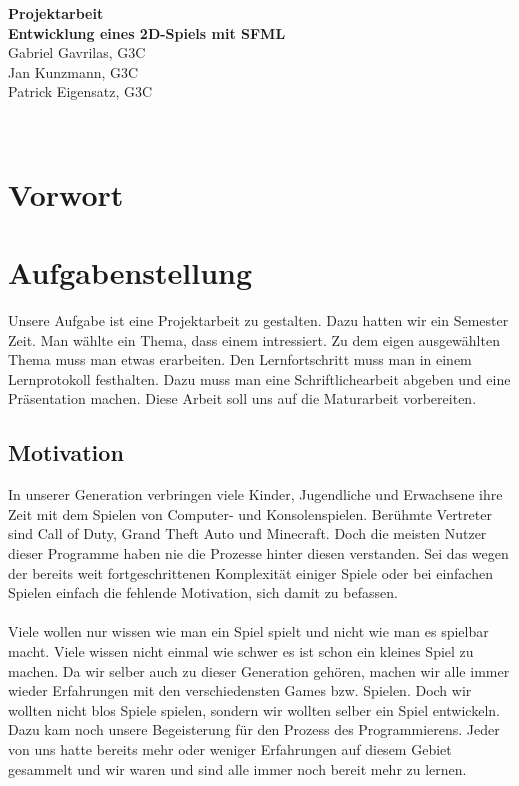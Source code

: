 \documentclass[12pt,a4paper]{scrartcl}
\begin{document}
\begin{titlepage}
\begin{center}

\vspace*{3cm}
\textbf{\huge{Projektarbeit}}\\
\vspace*{2cm}
\textbf{\large{Entwicklung eines 2D-Spiels mit SFML}}\\
\vspace*{5cm}
Gabriel Gavrilas, G3C\\
Jan Kunzmann, G3C\\
Patrick Eigensatz, G3C
\end{center}
\end{titlepage}


\clearpage
\newpage
\mbox{ }
\clearpage

\setcounter{page}{1}
\section*{Vorwort}


\newpage

\tableofcontents

\newpage

\section{Aufgabenstellung} 
Unsere Aufgabe ist eine Projektarbeit zu gestalten. Dazu hatten wir ein Semester Zeit. Man wählte ein Thema, dass einem intressiert. 
Zu dem eigen ausgewählten Thema muss man etwas erarbeiten. Den Lernfortschritt muss man in einem Lernprotokoll festhalten.
Dazu muss man eine Schriftlichearbeit abgeben und eine Präsentation machen. Diese Arbeit soll uns auf die Maturarbeit
vorbereiten.


\subsection{Motivation}
In unserer Generation verbringen viele Kinder, Jugendliche und Erwachsene
ihre Zeit mit dem Spielen von Computer- und Konsolenspielen.
Berühmte Vertreter sind Call of Duty, Grand Theft Auto und Minecraft.
Doch die meisten Nutzer dieser Programme haben nie die Prozesse hinter diesen verstanden.
Sei das wegen der bereits weit fortgeschrittenen Komplexität einiger Spiele
oder bei einfachen Spielen einfach die fehlende Motivation, sich damit zu befassen.\\
\\
Viele wollen nur wissen wie man ein Spiel spielt und nicht wie man es spielbar macht. Viele wissen nicht einmal wie schwer es ist schon ein
kleines Spiel zu machen.
Da wir selber auch zu dieser Generation gehören, 
machen wir alle immer wieder Erfahrungen mit den verschiedensten Games bzw. Spielen.
Doch wir wollten nicht blos Spiele spielen, 
sondern wir wollten selber ein Spiel entwickeln.
Dazu kam noch unsere Begeisterung für den Prozess des Programmierens.
Jeder von uns hatte bereits mehr oder weniger Erfahrungen auf diesem Gebiet gesammelt 
und wir waren und sind alle immer noch bereit mehr zu lernen.
\end{document}
